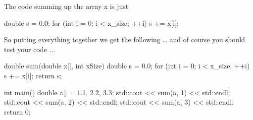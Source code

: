 The code summing up the array x is just

\begin{consolethree}[escapeinside=||]
double s = 0.0;
for (int i = 0; i < x\_size; ++i)
{
    s += x[i];
}
\end{consolethree}

So putting everything together we get the following \ldots{} and of
course you should test your code ...

\begin{consolethree}[escapeinside=||]
double sum(double x[], int xSize)
{
    double s = 0.0;
    for (int i = 0; i < x\_size; ++i)
    {
        s += x[i];
    }
    return s;
}

int main()
{
    double a[] = {1.1, 2.2, 3.3};
    std::cout << sum(a, 1) << std::endl;
    std::cout << sum(a, 2) << std::endl;
    std::cout << sum(a, 3) << std::endl;
    return 0;
}
\end{consolethree}








